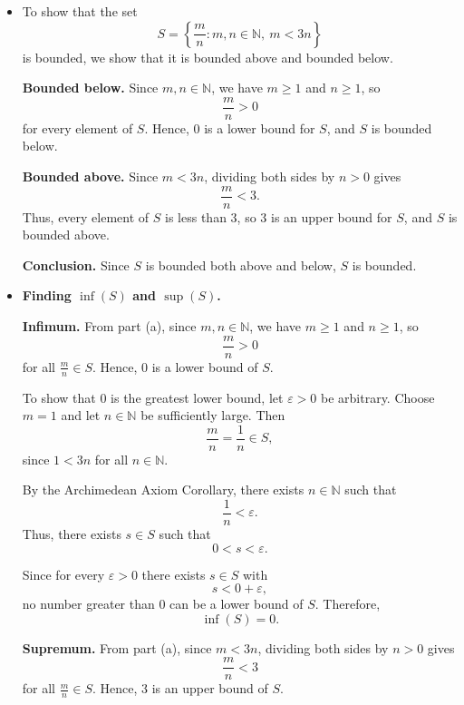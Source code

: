 \documentclass[12pt]{article}
\begin{document}
\begin{itemize}

\item[(a)] 
To show that the set
\[
S = \left\{ \frac{m}{n} : m,n \in \mathbb{N},\ m < 3n \right\}
\]
is bounded, we show that it is bounded above and bounded below.

\medskip

\textbf{Bounded below.}  
Since $m,n \in \mathbb{N}$, we have $m \ge 1$ and $n \ge 1$, so
\[
\frac{m}{n} > 0
\]
for every element of $S$. Hence, $0$ is a lower bound for $S$, and $S$ is bounded below.

\medskip

\textbf{Bounded above.}  
Since $m < 3n$, dividing both sides by $n > 0$ gives
\[
\frac{m}{n} < 3.
\]
Thus, every element of $S$ is less than $3$, so $3$ is an upper bound for $S$, and $S$ is bounded above.

\medskip

\textbf{Conclusion.}  
Since $S$ is bounded both above and below, $S$ is bounded.

\medskip

\item[(b)]
\textbf{Finding $\inf(S)$ and $\sup(S)$.}

\medskip

\textbf{Infimum.}  
From part (a), since $m,n \in \mathbb{N}$, we have $m \ge 1$ and $n \ge 1$, so
\[
\frac{m}{n} > 0
\]
for all $\frac{m}{n} \in S$. Hence, $0$ is a lower bound of $S$.

\medskip

To show that $0$ is the greatest lower bound, let $\varepsilon > 0$ be arbitrary.
Choose $m = 1$ and let $n \in \mathbb{N}$ be sufficiently large. Then
\[
\frac{m}{n} = \frac{1}{n} \in S,
\]
since $1 < 3n$ for all $n \in \mathbb{N}$.

By the Archimedean Axiom Corollary, there exists $n \in \mathbb{N}$ such that
\[
\frac{1}{n} < \varepsilon.
\]
Thus, there exists $s \in S$ such that
\[
0 < s < \varepsilon.
\]

\medskip

Since for every $\varepsilon > 0$ there exists $s \in S$ with
\[
s < 0 + \varepsilon,
\]
no number greater than $0$ can be a lower bound of $S$. Therefore,
\[
\inf(S) = 0.
\]

\medskip

\textbf{Supremum.}  
From part (a), since $m < 3n$, dividing both sides by $n > 0$ gives
\[
\frac{m}{n} < 3
\]
for all $\frac{m}{n} \in S$. Hence, $3$ is an upper bound of $S$.


\end{itemize}
\end{document}
